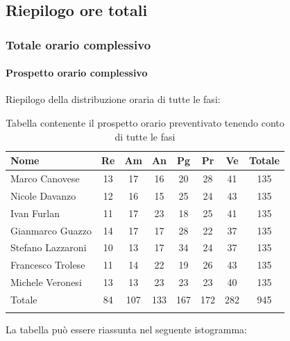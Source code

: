 			\subsection{Riepilogo ore totali}
			\subsubsection{Totale orario complessivo}
			\paragraph{Prospetto orario complessivo}
			Riepilogo della distribuzione oraria di tutte le fasi:
			
			\begin{longtable}{|l|c|c|c|c|c|c|c|}
				\hline
				\rowcolor{lighter-grayer}
				\textbf{Nome} & \textbf{Re} & \textbf{Am} & \textbf{An} & \textbf{Pg}  & \textbf{Pr}   & \textbf{Ve} & \textbf{Totale} \\
				\hline
				\endfirsthead
				
				\hline
				Marco Canovese & 13 & 17 & 16 & 20 & 28 & 41 & 135\\
				\hline
				\hline
				Nicole Davanzo & 12 & 16 & 15 & 25 & 24 & 43 & 135\\
				\hline
				\hline
				Ivan Furlan & 11 & 17 & 23 & 18 & 25 & 41 & 135\\
				\hline
				\hline
				Gianmarco Guazzo & 14 & 17 & 17 & 28 & 22 & 37 & 135\\
				\hline
				\hline
				Stefano Lazzaroni & 10 & 13 & 17 & 34 & 24 & 37 & 135\\
				\hline
				\hline
				Francesco Trolese & 11 & 14 & 22 & 19 & 26 & 43 & 135\\
				\hline
				\hline
				Michele Veronesi & 13 & 13 & 23 & 23 & 23 & 40 & 135\\
				\hline 
				\hline
				Totale & 84 & 107 & 133 & 167 & 172 & 282 & 945\\
				\hline 
				\rowcolor{white}
				\caption{Tabella contenente il prospetto orario preventivato tenendo conto di tutte le fasi}
			\end{longtable}

		
			La tabella può essere riassunta nel seguente istogramma:
		
